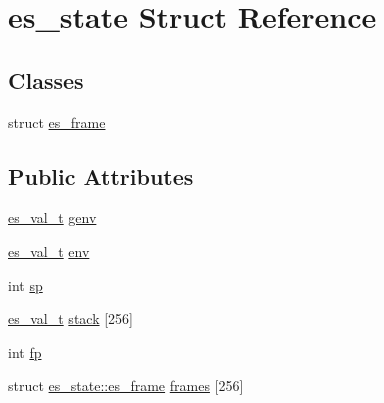 \hypertarget{structes__state}{\section{es\-\_\-state Struct Reference}
\label{structes__state}
}
\subsection*{Classes}
\begin{DoxyCompactItemize}
\item 
struct \hyperlink{structes__state_1_1es__frame}{es\-\_\-frame}
\end{DoxyCompactItemize}
\subsection*{Public Attributes}
\begin{DoxyCompactItemize}
\item 
\hyperlink{eva_8h_a31286b308f3660f383b567314be88045}{es\-\_\-val\-\_\-t} \hyperlink{structes__state_a6e1f2edd068f8bd2635f7ef93550efce}{genv}
\item 
\hyperlink{eva_8h_a31286b308f3660f383b567314be88045}{es\-\_\-val\-\_\-t} \hyperlink{structes__state_ae0839c4e0ee8dffc922fae02c8d74ea4}{env}
\item 
int \hyperlink{structes__state_a1b5c740c6ef0c58344525646f9eb9d5a}{sp}
\item 
\hyperlink{eva_8h_a31286b308f3660f383b567314be88045}{es\-\_\-val\-\_\-t} \hyperlink{structes__state_a4c92ffb8915396ec7f829975a5658a08}{stack} \mbox{[}256\mbox{]}
\item 
int \hyperlink{structes__state_a4be41ad3ddfeba5e608402cee42a226d}{fp}
\item 
struct \hyperlink{structes__state_1_1es__frame}{es\-\_\-state\-::es\-\_\-frame} \hyperlink{structes__state_a06c81d99b80e9f932018590b6c98b7a8}{frames} \mbox{[}256\mbox{]}
\end{DoxyCompactItemize}


